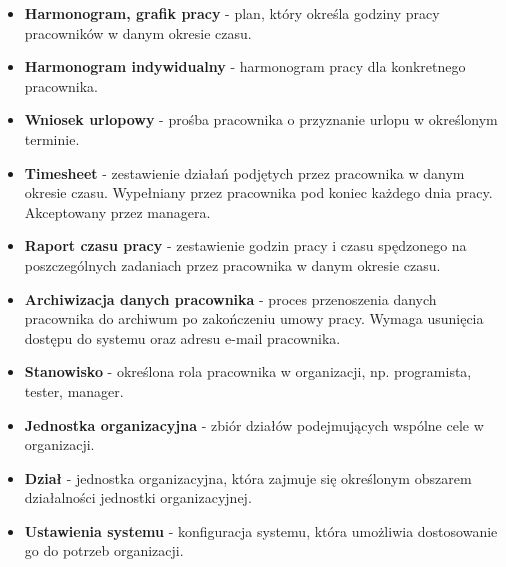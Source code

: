 \begin{itemize}
    \item \textbf{Harmonogram, grafik pracy} - plan, który określa godziny pracy pracowników w danym okresie czasu.
    \item \textbf{Harmonogram indywidualny} - harmonogram pracy dla konkretnego pracownika.
    \item \textbf{Wniosek urlopowy} - prośba pracownika o przyznanie urlopu w określonym terminie.
    \item \textbf{Timesheet} - zestawienie działań podjętych przez pracownika w danym okresie czasu. Wypełniany przez pracownika pod koniec każdego dnia pracy. Akceptowany przez managera.
    \item \textbf{Raport czasu pracy} - zestawienie godzin pracy i czasu spędzonego na poszczególnych zadaniach przez pracownika w danym okresie czasu.
    \item \textbf{Archiwizacja danych pracownika} - proces przenoszenia danych pracownika do archiwum po zakończeniu umowy pracy. Wymaga usunięcia dostępu do systemu oraz adresu e-mail pracownika.
    \item \textbf{Stanowisko} - określona rola pracownika w organizacji, np. programista, tester, manager.
    \item \textbf{Jednostka organizacyjna} - zbiór działów podejmujących wspólne cele w organizacji.
    \item \textbf{Dział} - jednostka organizacyjna, która zajmuje się określonym obszarem działalności jednostki organizacyjnej.
    \item \textbf{Ustawienia systemu} - konfiguracja systemu, która umożliwia dostosowanie go do potrzeb organizacji.
\end{itemize}


